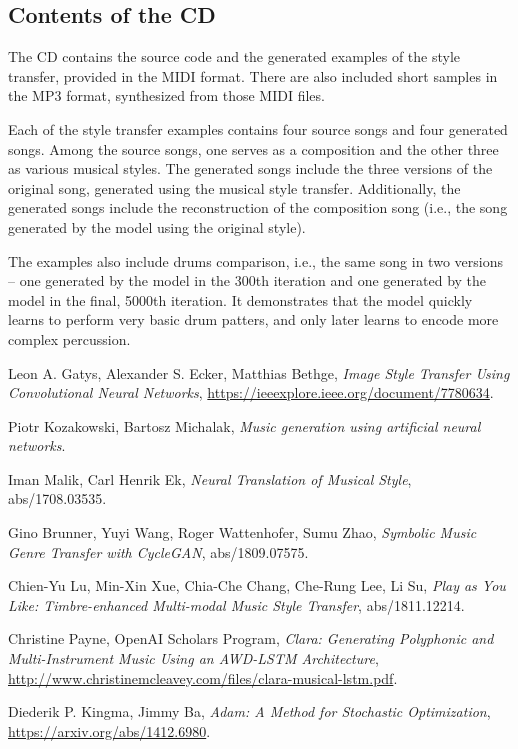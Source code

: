 \documentclass[en]{pracamgr}
\begin{document}
\begin{appendices}

\chapter{Contents of the CD}

The CD contains the source code and the generated examples of the style transfer, provided in the MIDI format.
There are also included short samples in the MP3 format, synthesized from those MIDI files.

Each of the style transfer examples contains four source songs and four generated songs.
Among the source songs, one serves as a composition and the other three as various musical styles.
The generated songs include the three versions of the original song, generated using the musical style transfer.
Additionally, the generated songs include the reconstruction of the composition song (i.e., the song generated by the model using the original style).

The examples also include drums comparison, i.e., the same song in two versions -- one generated by the model in the 300th iteration and one generated by the model in the final, 5000th iteration.
It demonstrates that the model quickly learns to perform very basic drum patters, and only later learns to encode more complex percussion.

\end{appendices}

\begin{thebibliography}{99}

{}

 Leon A. Gatys, Alexander S. Ecker, Matthias Bethge, \textit{Image Style Transfer Using Convolutional Neural Networks}, \url{https://ieeexplore.ieee.org/document/7780634}.

 Piotr Kozakowski, Bartosz Michalak, \textit{Music generation using artificial neural networks}.

 Iman Malik, Carl Henrik Ek, \textit{Neural Translation of Musical Style}, abs/1708.03535.

 Gino Brunner, Yuyi Wang, Roger Wattenhofer, Sumu Zhao, \textit{Symbolic Music Genre Transfer with CycleGAN}, abs/1809.07575.

 Chien-Yu Lu, Min-Xin Xue, Chia-Che Chang, Che-Rung Lee, Li Su, \textit{Play as You Like: Timbre-enhanced Multi-modal Music Style Transfer}, abs/1811.12214.

 Christine Payne, OpenAI Scholars Program, \textit{Clara: Generating Polyphonic and Multi-Instrument Music Using an AWD-LSTM Architecture}, \url{http://www.christinemcleavey.com/files/clara-musical-lstm.pdf}.

 Diederik P. Kingma, Jimmy Ba, \textit{Adam: A Method for Stochastic Optimization}, \url{https://arxiv.org/abs/1412.6980}.

\end{thebibliography}
\end{document}
